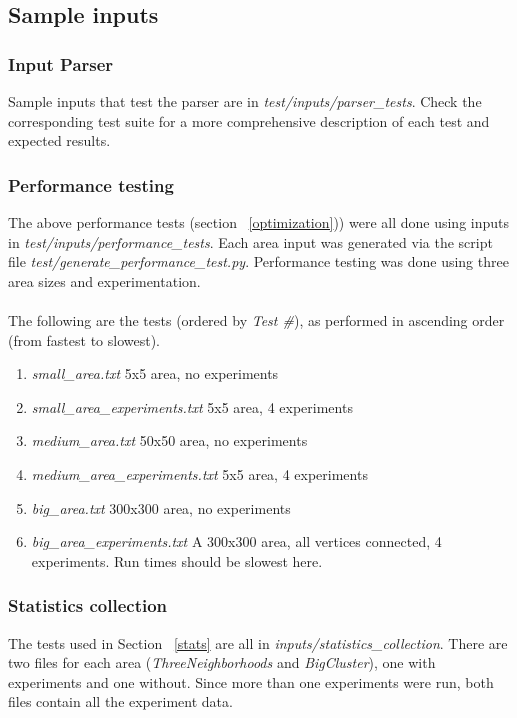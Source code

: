 \documentclass{article}
\begin{document}
		\subsection{Sample inputs}
		\subsubsection{Input Parser}
		Sample inputs that test the parser are in \textit{test/inputs/parser\_tests}. Check the corresponding test suite for a more comprehensive description
		of each test and expected results.
	
		\subsubsection{Performance testing} \label{performance}
		The above performance tests (section ~\ref{optimization})) were all done using inputs in \textit{test/inputs/performance\_tests}.
		Each area input was generated via the script file \textit{test/generate\_performance\_test.py}. Performance testing was done
		using three area sizes and experimentation.
		\\
		\\
		The following are the tests (ordered by \textit{Test \#}), as performed in ascending order (from fastest to slowest).
		\begin{enumerate}[start=0]
			\item \textit{small\_area.txt} \- 5x5 area, no experiments
			\item \textit{small\_area\_experiments.txt} \- 5x5 area, 4 experiments
			\item \textit{medium\_area.txt} \- 50x50 area, no experiments
			\item \textit{medium\_area\_experiments.txt} \- 5x5 area, 4 experiments
			\item \textit{big\_area.txt} \- 300x300 area, no experiments
			\item \textit{big\_area\_experiments.txt} \- A 300x300 area, all vertices connected, 4 experiments. Run times should be slowest here.
		\end{enumerate}

		\subsubsection{Statistics collection}
		The tests used in Section ~\ref{stats} are all in \textit{inputs/statistics\_collection}. There are two files for each area (\textit{ThreeNeighborhoods} and
		\textit{BigCluster}), one with experiments and one without. Since more than one experiments were run, both files contain all the experiment data.
\end{document}
